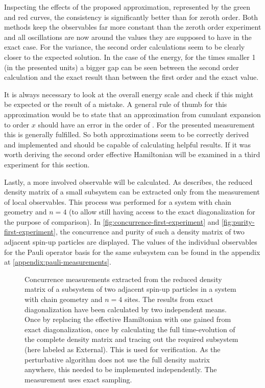 Inspecting the effects of the proposed approximation, represented by the green and red curves, the consistency is significantly better than for zeroth order.
Both methods keep the observables far more constant than the zeroth order experiment and all oscillations are now around the values they are supposed to have in the exact case.
For the variance, the second order calculations seem to be clearly closer to the expected solution.
In the case of the energy, for the times smaller 1 (in the presented units) a bigger gap can be seen between the second order calculation and the exact result than between the first order and the exact value.

It is always necessary to look at the overall energy scale and check if this might be expected or the result of a mistake.
A general rule of thumb for this approximation would be to state that an approximation from cumulant expansion to order $x$ should have an error in the order of . 
For the presented measurement this is generally fulfilled. 
So both approximations seem to be correctly derived and implemented and should be capable of calculating helpful results.
If it was worth deriving the second order effective Hamiltonian will be examined in a third experiment for this section.

Lastly, a more involved observable will be calculated.
As  describes, the reduced density matrix of a small subsystem can be extracted only from the measurement of local observables.
This process was performed for a system with chain geometry and $n=4$ (to allow still having access to the exact diagonalization for the purpose of comparison).
In \autoref{fig:concurrence-first-experiment} and \autoref{fig:purity-first-experiment}, the concurrence and purity of such a density matrix of two adjacent spin-up particles are displayed.
The values of the individual observables for the Pauli operator basis for the same subsystem can be found in the appendix at \ref{appendix:pauli-measurements}.


\begin{figure}[htbp]
    \centering
    \vspace{-0.3cm}
    \caption{
            Concurrence measurements extracted from the reduced density matrix of a subsystem of two adjacent spin-up particles in a system with chain geometry and $n=4$ sites.
            The results from exact diagonalization have been calculated by two independent means. 
            Once by replacing the effective Hamiltonian with one gained from exact diagonalization, once by calculating the full time-evolution of the complete density matrix and tracing out the required subsystem (here labeled as \glqq External\grqq).
            This is used for verification. 
            As the perturbative algorithm does not use the full density matrix anywhere, this needed to be implemented independently.
            The measurement uses exact sampling.
        }
    \label{fig:concurrence-first-experiment}
\end{figure}


